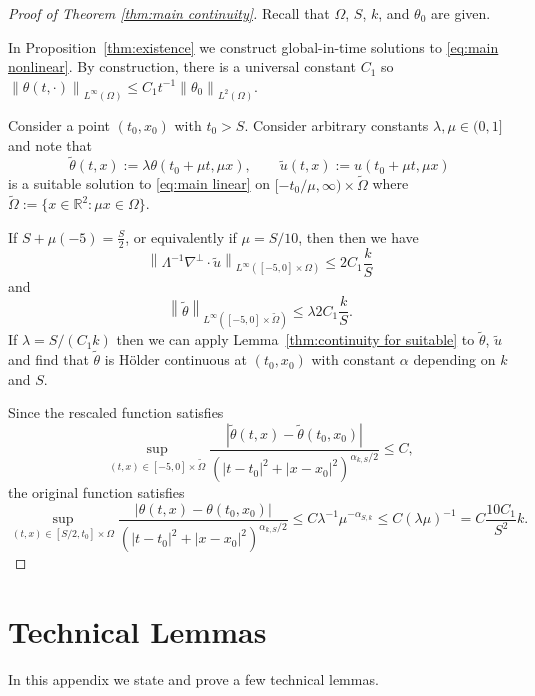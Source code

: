 \documentclass[11pt]{amsart}
\theoremstyle{remark}
\theoremstyle{definition}
\newcommand{\R}{\mathbb{R}}
\newcommand{\norm}[1]{\left\lVert#1\right\rVert}
\newcommand{\paren}[1]{\left( #1 \right)}
\newcommand{\grad}{\nabla}
\newcommand{\n}{^{-1}}
\begin{document}
\begin{proof}[Proof of Theorem \ref{thm:main continuity}]
Recall that $\Omega$, $S$, $k$, and $\theta_0$ are given.  

In Proposition~\ref{thm:existence} we construct global-in-time solutions to \eqref{eq:main nonlinear}.  By construction, there is a universal constant $C_1$ so $\norm{\theta(t,\cdot)}_{L^\infty(\Omega)} \leq C_1 t\n \norm{\theta_0}_{L^2(\Omega)}$.  

Consider a point $(t_0, x_0)$ with $t_0 > S$.  Consider arbitrary constants $\lambda, \mu \in (0,1]$ and note that
\[ \tilde{\theta}(t,x) := \lambda \theta(t_0 + \mu t, \mu x), \qquad \tilde{u}(t,x) := u(t_0 + \mu t, \mu x) \]
is a suitable solution to \eqref{eq:main linear} on $[-t_0/\mu,\infty) \times \tilde{\Omega}$ where $\tilde{\Omega} := \{x\in \R^2: \mu x \in \Omega \}$.  

If $S + \mu (-5) = \frac{S}{2}$, or equivalently if $\mu = S/10$, then then we have 
\[ \norm{\Lambda^{-1} \grad^\perp \cdot \tilde{u}}_{L^\infty([-5,0]\times\Omega)} \leq 2 C_1 \frac{k}{S} \]
and
\[ \norm{\tilde{\theta}}_{L^\infty([-5,0]\times\tilde{\Omega})} \leq \lambda 2 C_1 \frac{k}{S}. \]
If $\lambda = S / (C_1 k)$ then we can apply Lemma~\ref{thm:continuity for suitable} to $\tilde{\theta}$, $\tilde{u}$ and find that $\tilde{\theta}$ is H\"{o}lder continuous at $(t_0,x_0)$ with constant $\alpha$ depending on $k$ and $S$.  

Since the rescaled function satisfies
\[ \sup_{(t,x) \in [-5,0]\times\tilde{\Omega}} \frac{|\tilde{\theta}(t,x) - \tilde{\theta}(t_0,x_0)|}{\paren{|t-t_0|^2 + |x-x_0|^2}^{\alpha_{k,S}/2}} \leq C, \]
the original function satisfies
\[ \sup_{(t,x) \in [S/2,t_0]\times\Omega} \frac{|\theta(t,x) - \theta(t_0,x_0)|}{\paren{|t-t_0|^2 + |x-x_0|^2}^{\alpha_{k,S}/2}} \leq C \lambda\n \mu^{-\alpha_{S,k}} \leq C (\lambda\mu)\n = C \frac{10 C_1}{S^2} k. \]

\end{proof}


\vskip1cm
\appendix
\section{Technical Lemmas} \label{sec:technical}

In this appendix we state and prove a few technical lemmas.  
\end{document}
